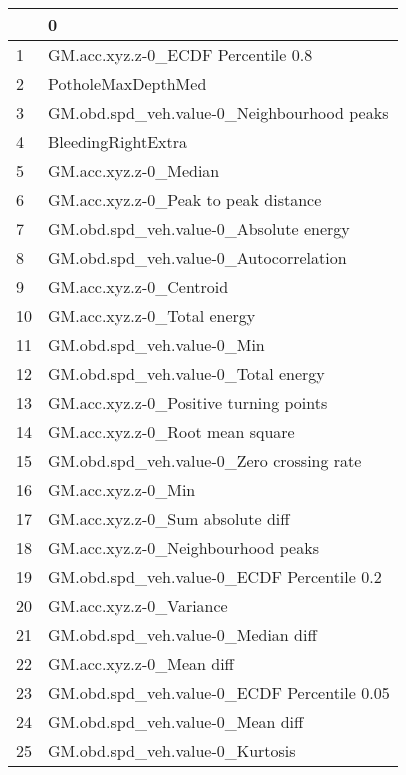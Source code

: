 \begin{tabular}{ll}
\toprule
{} &                                                 0 \\
\midrule
1  &                GM.acc.xyz.z-0\_ECDF Percentile 0.8 \\
2  &                                PotholeMaxDepthMed \\
3  &        GM.obd.spd\_veh.value-0\_Neighbourhood peaks \\
4  &                                BleedingRightExtra \\
5  &                             GM.acc.xyz.z-0\_Median \\
6  &              GM.acc.xyz.z-0\_Peak to peak distance \\
7  &            GM.obd.spd\_veh.value-0\_Absolute energy \\
8  &            GM.obd.spd\_veh.value-0\_Autocorrelation \\
9  &                           GM.acc.xyz.z-0\_Centroid \\
10 &                       GM.acc.xyz.z-0\_Total energy \\
11 &                        GM.obd.spd\_veh.value-0\_Min \\
12 &               GM.obd.spd\_veh.value-0\_Total energy \\
13 &            GM.acc.xyz.z-0\_Positive turning points \\
14 &                   GM.acc.xyz.z-0\_Root mean square \\
15 &         GM.obd.spd\_veh.value-0\_Zero crossing rate \\
16 &                                GM.acc.xyz.z-0\_Min \\
17 &                  GM.acc.xyz.z-0\_Sum absolute diff \\
18 &                GM.acc.xyz.z-0\_Neighbourhood peaks \\
19 &        GM.obd.spd\_veh.value-0\_ECDF Percentile 0.2 \\
20 &                           GM.acc.xyz.z-0\_Variance \\
21 &                GM.obd.spd\_veh.value-0\_Median diff \\
22 &                          GM.acc.xyz.z-0\_Mean diff \\
23 &       GM.obd.spd\_veh.value-0\_ECDF Percentile 0.05 \\
24 &                  GM.obd.spd\_veh.value-0\_Mean diff \\
25 &                   GM.obd.spd\_veh.value-0\_Kurtosis \\

\end{tabular}
